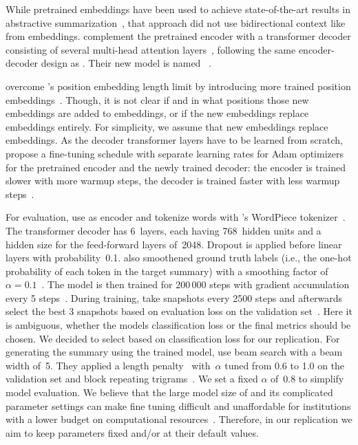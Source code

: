 While pretrained \Elmo embeddings have been used to achieve state-of-the-art results in abstractive summarization~\cite{EdunovBA2019}, that approach did not use bidirectional context like from \Bert embeddings. 
\citeauthor{LiuL2019} complement the pretrained \Bert encoder with a transformer decoder consisting of several multi-head attention layers~\cite{LiuL2019,DevlinCLT2019,VaswaniSPUJGKP2017}, following the same encoder-decoder design as \textcite{SeeLM2017}. Their new model is named \BertSumAbs~\cite{LiuL2019}.

\citeauthor{LiuL2019} overcome \Bert's position embedding length limit by introducing more trained position embeddings~\cite{LiuL2019}. Though, it is not clear if and in what positions those new embeddings are added to \Bert embeddings, or if the new embeddings replace \Bert embeddings entirely. For simplicity, we assume that new embeddings replace \Bert embeddings.
As the decoder transformer layers have to be learned from scratch, \citeauthor{LiuL2019} propose a fine-tuning schedule with separate learning rates for Adam optimizers for the pretrained \Bert encoder and the newly trained decoder: the encoder is trained slower with more warmup steps, the decoder is trained faster with less warmup steps~\cite{LiuL2019}.

For evaluation, \citeauthor{LiuL2019} use \BertBase as encoder and tokenize words with \Bert's WordPiece tokenizer~\cite{LiuL2019}.
The transformer decoder has 6~layers, each having 768~hidden units and a hidden size for the feed-forward layers of~2048. Dropout is applied before linear layers with probability~0.1.
\citeauthor{LiuL2019} also smoothened ground truth labels (i.e., the one-hot probability of each token in the target summary) with a smoothing factor of~\(\alpha = 0.1\)~\cite{LiuL2019,SzegedyVISW2016}.
The model is then trained for 200\,000 steps with gradient accumulation every 5 steps~\cite{LiuL2019}.
During training, \citeauthor{LiuL2019} take snapshots every 2500 steps and afterwards select the best 3 snapshots based on evaluation loss on the validation set~\cite{LiuL2019}.
Here it is ambiguous, whether the models classification loss or the final \Rouge metrics should be chosen. We decided to select based on classification loss for our replication.
For generating the summary using the trained model, \citeauthor{LiuL2019} use beam search with a beam width of~5. They applied a length penalty~\cite{WuSCLNMKCGMKSJL2016} with~\(\alpha\) tuned from 0.6 to 1.0 on the validation set and block repeating trigrams~\cite{PaulusXS2018}.
We set a fixed \(\alpha\) of~0.8 to simplify model evaluation.
We believe that the large model size of \BertSumAbs and its complicated parameter settings can make fine tuning difficult and unaffordable for institutions with a lower budget on computational resources~\cite{JiaoYSJCL0L2020}.
Therefore, in our replication we aim to keep parameters fixed and/or at their default values.
